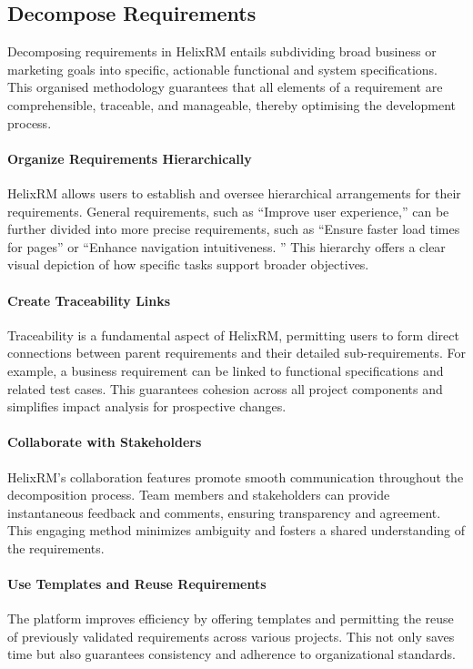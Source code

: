 \subsection{Decompose Requirements}

Decomposing requirements in HelixRM entails subdividing broad business or marketing goals into specific, actionable functional and system specifications. This organised methodology guarantees that all elements of a requirement are comprehensible, traceable, and manageable, thereby optimising the development process.

\paragraph{Organize Requirements Hierarchically}
HelixRM allows users to establish and oversee hierarchical arrangements for their requirements. General requirements, such as “Improve user experience,” can be further divided into more precise requirements, such as “Ensure faster load times for pages” or “Enhance navigation intuitiveness. ” This hierarchy offers a clear visual depiction of how specific tasks support broader objectives.

\paragraph{Create Traceability Links}
Traceability is a fundamental aspect of HelixRM, permitting users to form direct connections between parent requirements and their detailed sub-requirements. For example, a business requirement can be linked to functional specifications and related test cases. This guarantees cohesion across all project components and simplifies impact analysis for prospective changes.

\paragraph{Collaborate with Stakeholders}
HelixRM’s collaboration features promote smooth communication throughout the decomposition process. Team members and stakeholders can provide instantaneous feedback and comments, ensuring transparency and agreement. This engaging method minimizes ambiguity and fosters a shared understanding of the requirements.

\paragraph{Use Templates and Reuse Requirements}
The platform improves efficiency by offering templates and permitting the reuse of previously validated requirements across various projects. This not only saves time but also guarantees consistency and adherence to organizational standards.

